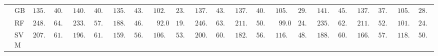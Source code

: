 \begin{tabular}{llllllllllllllllllllll}
	& GB  & $135.812$ & $40.816$ & $140.921$ & $40.573$ & $135.510$ & $43.275$ & $102.763$ & $23.849$ & $137.560$ & $43.883$ & $137.808$ & $40.068$ & $105.821$ & $29.447$ & $141.906$ & $45.697$ & $137.212$ & $37.811$ & $105.834$ & $28.599$ \\
	& RF  & $248.001$ & $64.295$ & $233.826$ & $57.679$ & $188.905$ & $46.879$ & $\phantom{0}92.071$ & $19.257$ & $246.706$ & $63.527$ & $211.647$ & $50.441$ & $\phantom{0}99.022$ & $24.832$ & $235.415$ & $62.415$ & $211.856$ & $52.405$ & $101.307$ & $24.452$ \\
	& SVM  & $207.957$ & $61.720$ & $196.815$ & $61.630$ & $159.388$ & $56.783$ & $106.807$ & $53.412$ & $200.958$ & $60.842$ & $182.386$ & $56.868$ & $116.606$ & $48.592$ & $188.419$ & $60.121$ & $166.756$ & $57.132$ & $118.048$ & $50.595$ \\
	\hline 
\end{tabular}